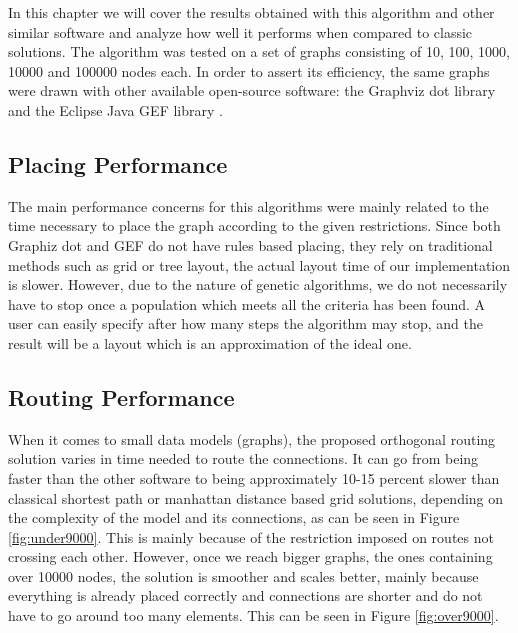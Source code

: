 \label{chap:results}

In this chapter we will cover the results obtained with this algorithm and
other similar software and analyze how well it performs when compared to
classic solutions. The algorithm was tested on a set of graphs consisting of 
10, 100, 1000, 10000 and 100000 nodes each. In order to assert its efficiency, 
the same graphs were drawn with other available open-source software: the Graphviz
dot library \cite{gansner2009drawing} and the Eclipse Java GEF library \cite{rubel2011eclipse}.

\subsection{Placing Performance}

The main performance concerns for this algorithms were mainly related to the 
time necessary to place the graph according to the given restrictions. Since 
both Graphiz dot and GEF do not have rules based placing, they rely on 
traditional methods such as grid or tree layout, the actual layout time of our 
implementation is slower. However, due to the nature of genetic algorithms, we 
do not necessarily have to stop once a population which meets all the criteria 
has been found. A user can easily specify after how many steps the algorithm may 
stop, and the result will be a layout which is an approximation of the ideal one.

\subsection{Routing Performance}

When it comes to small data models (graphs), the proposed orthogonal routing 
solution varies in time needed to route the connections. It can go from being 
faster than the other software to being approximately 10-15 percent slower than 
classical shortest path or manhattan distance based grid solutions, depending on 
the complexity of the model and its connections, as can be seen in Figure \ref{fig:under9000}. This is mainly because of the 
restriction imposed on routes not crossing each other. However, once we reach 
bigger graphs, the ones containing over 10000 nodes, the solution is smoother and
scales better, mainly because everything is already placed correctly and connections 
are shorter and do not have to go around too many elements. This can be seen in Figure \ref{fig:over9000}. 

